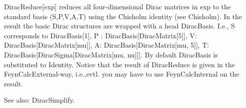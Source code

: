 






DiracReduce[exp] reduces all four-dimensional Dirac matrices in exp to the standard basis (S,P,V,A,T) using the Chisholm identity (see
  Chisholm). In the result the basic Dirac structures are wrapped with a head DiracBasis. I.e., S corresponds to DiracBasis[1], P :
  DiracBasis[DiracMatrix[5]], V: DiracBasis[DiracMatrix[mu]], A: DiracBasis[DiracMatrix[mu, 5]], T: DiracBasis[DiracSigma[DiracMatrix[mu,
  nu]]]. By default DiracBasis is substituted to Identity. Notice that the result of DiracReduce is given in the FeynCalcExternal-way,
  i.e.,evtl. you may have to use FeynCalcInternal on the result.



See also:  DiracSimplify.







\dispSFoutmath{
{{\gamma }^{\mu }}{{\gamma }^{\nu }}{{\gamma }^{\rho }}
}

